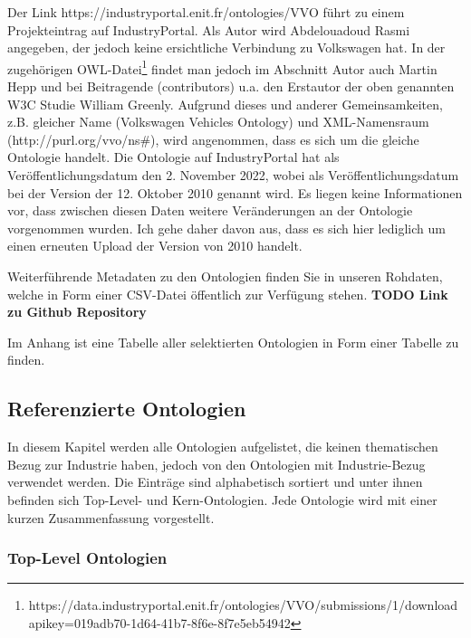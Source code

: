 \documentclass{article}
\begin{document}
Der Link https://industryportal.enit.fr/ontologies/VVO führt zu einem Projekteintrag auf IndustryPortal.
Als Autor wird Abdelouadoud Rasmi angegeben, der jedoch keine ersichtliche Verbindung zu Volkswagen hat.
In der zugehörigen OWL-Datei\footnote{https://data.industryportal.enit.fr/ontologies/VVO/submissions/1/downloadapikey=019adb70-1d64-41b7-8f6e-8f7e5eb54942} findet man jedoch im Abschnitt Autor auch Martin Hepp und bei Beitragende (contributors) u.a. den Erstautor der oben genannten W3C Studie William Greenly.
Aufgrund dieses und anderer Gemeinsamkeiten, z.B. gleicher Name (Volkswagen Vehicles Ontology) und XML-Namensraum (http://purl.org/vvo/ns\#), wird angenommen, dass es sich um die gleiche Ontologie handelt. Die Ontologie auf IndustryPortal hat als Veröffentlichungsdatum den 2. November 2022, wobei als Veröffentlichungsdatum bei der Version der 12. Oktober 2010 genannt wird.
Es liegen keine Informationen vor, dass zwischen diesen Daten weitere Veränderungen an der Ontologie vorgenommen wurden.
Ich gehe daher davon aus, dass es sich hier lediglich um einen erneuten Upload der Version von 2010 handelt.




Weiterführende Metadaten zu den Ontologien finden Sie in unseren Rohdaten, welche in Form einer CSV-Datei öffentlich zur Verfügung stehen. \textbf{TODO Link zu Github Repository}

Im Anhang ist eine Tabelle aller selektierten Ontologien in Form einer Tabelle zu finden.

\subsection{Referenzierte Ontologien}

In diesem Kapitel werden alle Ontologien aufgelistet, die keinen thematischen Bezug zur Industrie haben, jedoch von den Ontologien mit Industrie-Bezug verwendet werden.
Die Einträge sind alphabetisch sortiert und unter ihnen befinden sich Top-Level- und Kern-Ontologien.
Jede Ontologie wird mit einer kurzen Zusammenfassung vorgestellt.

\subsubsection{Top-Level Ontologien}
\end{document}
